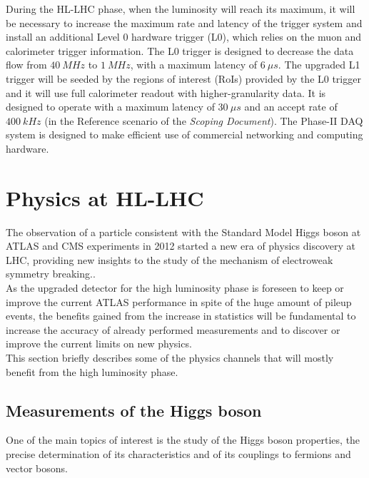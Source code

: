 \documentclass[a4paper,twoside,12pt]{article}
\begin{document}
During the HL-LHC phase, when the luminosity will reach its maximum, it will be necessary
to increase the maximum rate and latency of the trigger system and install an additional Level 0 hardware trigger (L0), which relies on the muon and calorimeter trigger information. The L0 trigger is designed to decrease the data flow from $40\ MHz$ to $1\ MHz$, with a maximum latency of $6\ \mu s$. The upgraded L1 trigger will be seeded by the regions of interest (RoIs) provided by the L0
trigger and it will use full calorimeter readout with higher-granularity data. It is designed to
operate with a maximum latency of $30\ \mu s$ and an accept rate of $400\ kHz$ (in the Reference scenario of the \textit{Scoping Document}\cite{scoping}). The Phase-II DAQ system is designed to make 
efficient use of commercial networking and computing hardware. 

\clearpage

\section{Physics at HL-LHC}\label{sec:physics}

The observation of a particle consistent with the Standard Model Higgs boson at ATLAS and
CMS experiments in 2012 started a new era of physics discovery at LHC, providing
new insights to the study of the mechanism of electroweak symmetry breaking.\cite{loi}.\\

As the upgraded detector for the high luminosity phase is foreseen to keep or improve
the current ATLAS performance in spite of the huge amount of pileup events, the benefits gained from the increase in statistics
will be fundamental to increase the accuracy of already performed measurements and
to discover or improve the current limits on new physics.\\

This section briefly describes some of the physics channels that will mostly benefit
from the high luminosity phase.

\subsection{Measurements of the Higgs boson}
One of the main topics of interest is the study of the Higgs boson properties, the precise determination of its characteristics
and of its couplings to fermions and vector bosons\cite{loi}. \\
\end{document}
